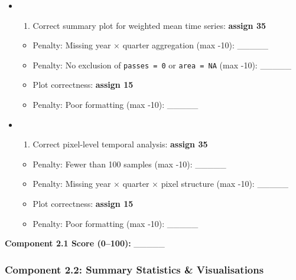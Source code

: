 \documentclass[
  10pt,
]{article}
\providecommand{\tightlist}{%
  \setlength{\itemsep}{0pt}\setlength{\parskip}{0pt}}
\let\oldtexttt\texttt
\renewcommand{\texttt}[1]{\oldtexttt{\small #1}}
\begin{document}
\begin{itemize}
\item
  \begin{enumerate}
  \def\labelenumi{(\arabic{enumi})}
  \tightlist
  \item
    Correct summary plot for weighted mean time series: \textbf{assign
    35}\\
  \end{enumerate}

  \begin{itemize}
  \tightlist
  \item
    Penalty: Missing year × quarter aggregation (max -10): \_\_\_\_\_\\
  \item
    Penalty: No exclusion of \texttt{passes\ =\ 0} or
    \texttt{area\ =\ NA} (max -10): \_\_\_\_\_\\
  \item
    Plot correctness: \textbf{assign 15}\\
  \item
    Penalty: Poor formatting (max -10): \_\_\_\_\_
  \end{itemize}
\item
  \begin{enumerate}
  \def\labelenumi{(\arabic{enumi})}
  \setcounter{enumi}{1}
  \tightlist
  \item
    Correct pixel-level temporal analysis: \textbf{assign 35}\\
  \end{enumerate}

  \begin{itemize}
  \tightlist
  \item
    Penalty: Fewer than 100 samples (max -10): \_\_\_\_\_\\
  \item
    Penalty: Missing year × quarter × pixel structure (max -10):
    \_\_\_\_\_\\
  \item
    Plot correctness: \textbf{assign 15}\\
  \item
    Penalty: Poor formatting (max -10): \_\_\_\_\_
  \end{itemize}
\end{itemize}

\textbf{Component 2.1 Score (0--100):} \_\_\_\_\_

\subsubsection{Component 2.2: Summary Statistics \&
Visualisations}\label{component-2.2-summary-statistics-visualisations}
\end{document}
